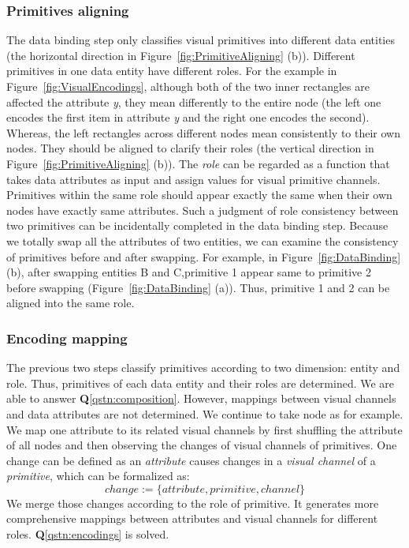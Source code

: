 \subsubsection{Primitives aligning}
The data binding step only classifies visual primitives into different data entities (the horizontal direction in Figure~\ref{fig:PrimitiveAligning} (b)).
Different primitives in one data entity have different roles.
For the example in Figure~\ref{fig:VisualEncodings}, although both of the two inner rectangles are affected the attribute \textit{y}, they mean differently to the entire node (the left one encodes the first item in attribute \textit{y} and the right one encodes the second).
Whereas, the left rectangles across different nodes mean consistently to their own nodes.
They should be aligned to clarify their roles (the vertical direction in Figure~\ref{fig:PrimitiveAligning} (b)).
The \textit{role} can be regarded as a function that takes data attributes as input and assign values for visual primitive channels.
Primitives within the same role should appear exactly the same when their own nodes have exactly same attributes.
Such a judgment of role consistency between two primitives can be incidentally completed in the data binding step.
Because we totally swap all the attributes of two entities, we can examine the consistency of primitives before and after swapping.
For example, in Figure~\ref{fig:DataBinding} (b), after swapping entities B and C,primitive 1 appear same to primitive 2 before swapping (Figure~\ref{fig:DataBinding} (a)). Thus, primitive 1 and 2 can be aligned into the same role.

\subsubsection{Encoding mapping}
The previous two steps classify primitives according to two dimension: entity and role.
Thus, primitives of each data entity and their roles are determined.
We are able to answer \textbf{Q}\ref{qstn:composition}.
However, mappings between visual channels and data attributes are not determined.
We continue to take node as for example.
We map one attribute to its related visual channels by first shuffling the attribute of all nodes and then observing the changes of visual channels of primitives.
One change can be defined as an \textit{attribute} causes changes in a \textit{visual channel} of a \textit{primitive}, which can be formalized as:
\begin{equation}
    change := \{ attribute, primitive, channel \}
\end{equation}
We merge those changes according to the role of primitive.
It generates more comprehensive mappings between attributes and visual channels for different roles.
\textbf{Q}\ref{qstn:encodings} is solved.


